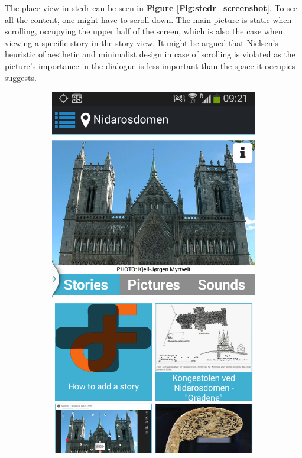 The place view in stedr can be seen in \textbf{Figure \ref{Fig:stedr_screenshot}}. To see all the content, one might have to scroll down. The main picture is static when scrolling, occupying the upper half of the screen, which is also the case when viewing a specific story in the story view. It might be argued that Nielsen's heuristic of aesthetic and minimalist design in case of scrolling is violated as the picture's importance in the dialogue is less important than the space it occupies suggests. \newline

\begin{figure}[h]
	\centering
	\begin{subfigure}[t]{0.3\textwidth}
		\includegraphics[width=\textwidth]{fig/stedr_screenshot}

\end{subfigure}
\end{figure}
